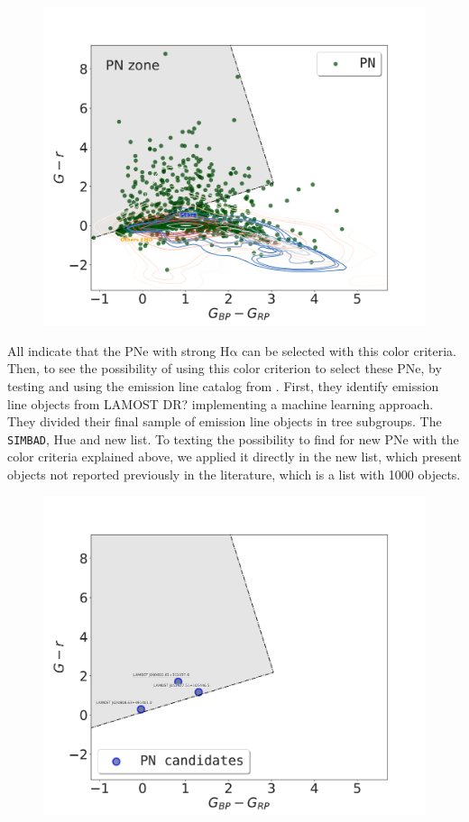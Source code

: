 \documentclass[twocolumn]{article}
\newcommand\ha{\ensuremath{\mathrm{H\alpha}}}
\begin{document}
\begin{figure}
\centering
  \includegraphics[width=0.9\linewidth]{../Figs/color-diagram-ps-gaiaEDR3.pdf}
  \caption{} 
  \label{fig:gaia-ps}
\end{figure}

All indicate that the PNe with strong \ha{} can be selected with this color criteria.
Then, to see the possibility of using this color criterion to select these PNe, by
testing and using the emission line catalog from  \citet{Skoda:2020}. First, they
identify emission line objects from LAMOST DR? implementing a machine learning approach.
They divided their final sample of emission line objects in tree subgroups. The \texttt{SIMBAD},
Hue and new list. To texting the possibility to find for new PNe with the color criteria
explained above, we applied it directly in the new list, which present objects not reported
previously in the literature, which is a list with 1000 objects.

\begin{figure}
\centering
  \includegraphics[width=0.9\linewidth]{../Figs/pn-candidates-gaiaDR3.pdf}
  \caption{} 
  \label{fig:gaia-ps-apply}
\end{figure}
\end{document}
